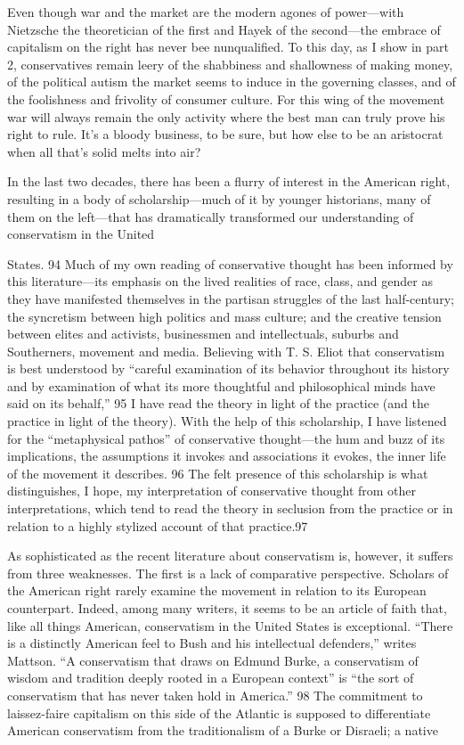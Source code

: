  \par 
Even though war and the market are the modern agones of power—with Nietzsche the theoretician of the first and Hayek of the second—the embrace of capitalism on the right has never bee nunqualified. To this day, as I show in part 2, conservatives remain leery of the shabbiness and shallowness of making money, of the political autism the market seems to induce in the governing classes, and of the foolishness and frivolity of consumer culture. For this wing of the movement war will always remain the only activity where the best man can truly prove his right to rule. It’s a bloody business, to be sure, but how else to be an aristocrat when all that’s solid melts into air?
 \par 
In the last two decades, there has been a flurry of interest in the American right, resulting in a body of scholarship—much of it by younger historians, many of them on the left—that has dramatically transformed our understanding of conservatism in the United
 \par 
States. {\color{blue}94} Much of my own reading of conservative thought has been informed by this literature—its emphasis on the lived realities of race, class, and gender as they have manifested themselves in the partisan struggles of the last half-century; the syncretism between high politics and mass culture; and the creative tension between elites and activists, businessmen and intellectuals, suburbs and Southerners, movement and media. Believing with T. S. Eliot that conservatism is best understood by “careful examination of its behavior throughout its history and by examination of what its more thoughtful and philosophical minds have said on its behalf,” {\color{blue}95} I have read the theory in light of the practice (and the practice in light of the theory). With the help of this scholarship, I have listened for the “metaphysical pathos” of conservative thought—the hum and buzz of its implications, the assumptions it invokes and associations it evokes, the inner life of the movement it describes. {\color{blue}96} The felt presence of this scholarship is what distinguishes, I hope, my interpretation of conservative thought from other interpretations, which tend to read the theory in seclusion from the practice or in relation to a highly stylized account of that practice.{\color{blue}97}
 \par 
As sophisticated as the recent literature about conservatism is, however, it suffers from three weaknesses. The first is a lack of comparative perspective. Scholars of the American right rarely examine the movement in relation to its European counterpart. Indeed, among many writers, it seems to be an article of faith that, like all things American, conservatism in the United States is exceptional. “There is a distinctly American feel to Bush and his intellectual defenders,” writes Mattson. “A conservatism that draws on Edmund Burke, a conservatism of wisdom and tradition deeply rooted in a European context” is “the sort of conservatism that has never taken hold in America.” {\color{blue}98} The commitment to laissez-faire capitalism on this side of the Atlantic is supposed to differentiate American conservatism from the traditionalism of a Burke or Disraeli; a native
